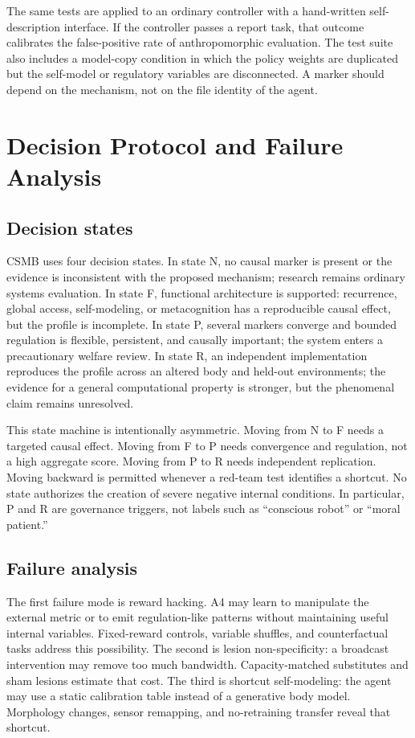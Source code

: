\documentclass[conference]{IEEEtran}
\begin{document}
The same tests are applied to an ordinary controller with a hand-written self-description interface. If the controller passes a report task, that outcome calibrates the false-positive rate of anthropomorphic evaluation. The test suite also includes a model-copy condition in which the policy weights are duplicated but the self-model or regulatory variables are disconnected. A marker should depend on the mechanism, not on the file identity of the agent.

\section{Decision Protocol and Failure Analysis}

\subsection{Decision states}

CSMB uses four decision states. In state N, no causal marker is present or the evidence is inconsistent with the proposed mechanism; research remains ordinary systems evaluation. In state F, functional architecture is supported: recurrence, global access, self-modeling, or metacognition has a reproducible causal effect, but the profile is incomplete. In state P, several markers converge and bounded regulation is flexible, persistent, and causally important; the system enters a precautionary welfare review. In state R, an independent implementation reproduces the profile across an altered body and held-out environments; the evidence for a general computational property is stronger, but the phenomenal claim remains unresolved.

This state machine is intentionally asymmetric. Moving from N to F needs a targeted causal effect. Moving from F to P needs convergence and regulation, not a high aggregate score. Moving from P to R needs independent replication. Moving backward is permitted whenever a red-team test identifies a shortcut. No state authorizes the creation of severe negative internal conditions. In particular, P and R are governance triggers, not labels such as “conscious robot” or “moral patient.”

\subsection{Failure analysis}

The first failure mode is reward hacking. A4 may learn to manipulate the external metric or to emit regulation-like patterns without maintaining useful internal variables. Fixed-reward controls, variable shuffles, and counterfactual tasks address this possibility. The second is lesion non-specificity: a broadcast intervention may remove too much bandwidth. Capacity-matched substitutes and sham lesions estimate that cost. The third is shortcut self-modeling: the agent may use a static calibration table instead of a generative body model. Morphology changes, sensor remapping, and no-retraining transfer reveal that shortcut.
\end{document}

